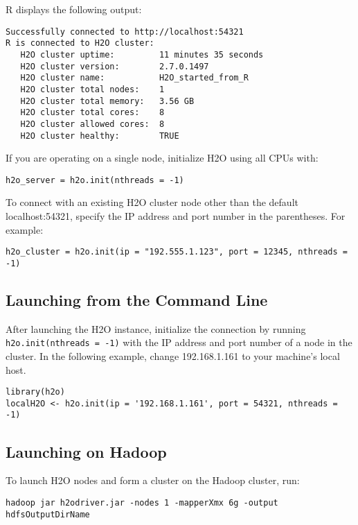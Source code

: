 R displays the following output: 
\begin{lstlisting}[style=R]
Successfully connected to http://localhost:54321
R is connected to H2O cluster:
   H2O cluster uptime:         11 minutes 35 seconds
   H2O cluster version:        2.7.0.1497
   H2O cluster name:           H2O_started_from_R
   H2O cluster total nodes:    1
   H2O cluster total memory:   3.56 GB
   H2O cluster total cores:    8
   H2O cluster allowed cores:  8
   H2O cluster healthy:        TRUE
\end{lstlisting}

If you are operating on a single node, initialize H2O using all CPUs with: 
\begin{lstlisting}[style=R]
h2o_server = h2o.init(nthreads = -1)
\end{lstlisting}

To connect with an existing H2O cluster node other than the default localhost:54321, specify the IP address and port number in the parentheses. For example:
\begin{lstlisting}[style=R]
h2o_cluster = h2o.init(ip = "192.555.1.123", port = 12345, nthreads = -1)
\end{lstlisting}


\subsection{Launching from the Command Line}

After launching the H2O instance, initialize the connection by running {\texttt{h2o.init(nthreads = -1)}} with the IP address and port number of a node in the cluster. In the following example, change 192.168.1.161 to your machine's local host. 
\begin{lstlisting}[style=R]
library(h2o)
localH2O <- h2o.init(ip = '192.168.1.161', port = 54321, nthreads = -1)
\end{lstlisting}

\subsection{Launching on Hadoop}

To launch H2O nodes and form a cluster on the Hadoop cluster, run:
\begin{lstlisting}[style=R]
hadoop jar h2odriver.jar -nodes 1 -mapperXmx 6g -output hdfsOutputDirName
\end{lstlisting}

